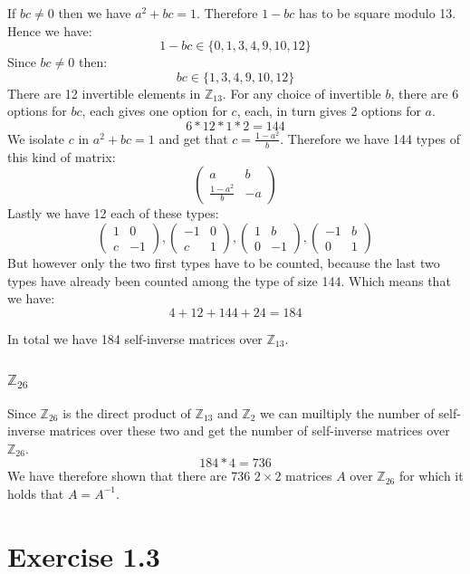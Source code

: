\documentclass[11pt]{report}
\begin{document}
If $bc \neq 0$ then we have $a^2 + bc = 1$. Therefore $1 - bc$ has to be square modulo 13. Hence we have:\\
$$1 - bc \in \{0,1,3,4,9,10,12\}$$
Since $bc \neq 0$ then:
$$bc \in \{1,3,4,9,10,12\}$$
There are 12 invertible elements in $\mathbb{Z}_{13}$. For any choice of invertible $b$, there are 6 options for $bc$, each gives one option for $c$, each, in turn gives 2 options for $a$.\\
$$6 * 12 * 1 * 2 = 144$$
We isolate $c$ in $a^2 + bc = 1$ and get that $c = \frac{1-a^2}{b}$. Therefore we have 144 types of this kind of matrix:\\
$$\begin{pmatrix}
a & b\\
\frac{1-a^2}{b} & -a
\end{pmatrix}$$
Lastly we have 12 each of these types:
$$
\begin{pmatrix}
1 & 0\\
c & -1
\end{pmatrix}
,
\begin{pmatrix}
-1 & 0\\
c & 1
\end{pmatrix}
,
\begin{pmatrix}
1 & b\\
0 & -1
\end{pmatrix}
,
\begin{pmatrix}
-1 & b\\
0 & 1
\end{pmatrix}
$$
But however only the two first types have to be counted, because the last two types have already been counted among the type of size 144. Which means that we have:
$$4 + 12 + 144 + 24 = 184$$

In total we have 184 self-inverse matrices over $\mathbb{Z}_{13}$.

\subsubsection*{$\mathbb{Z}_{26}$}
Since $\mathbb{Z}_{26}$ is the direct product of $\mathbb{Z}_{13}$ and $\mathbb{Z}_{2}$ we can muiltiply the number of self-inverse matrices over these two and get the number of self-inverse matrices over $\mathbb{Z}_{26}$.
$$184 * 4 = 736$$
We have therefore shown that there are 736 $2 \times 2$ matrices $A$ over $\mathbb{Z}_{26}$ for which it holds that $A= A^{-1}$.

\section*{Exercise 1.3}
\end{document}
